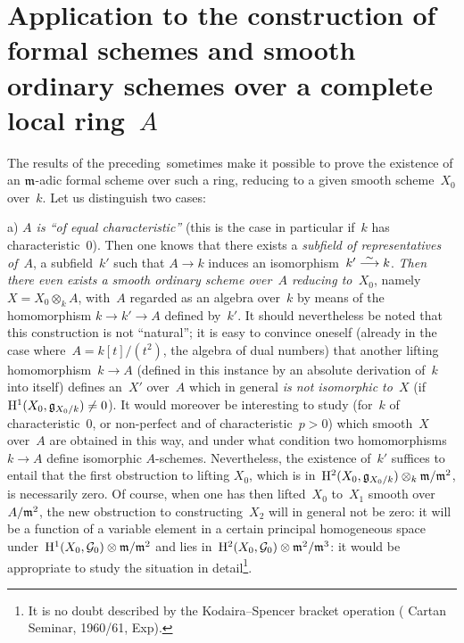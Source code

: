 \section[Application to the construction of formal schemes...]{Application to the construction of formal schemes
and smooth ordinary schemes over a complete local ring~$A$}
\label{III.7}
%
%
The results of the preceding~\No sometimes make it possible to
prove the existence
%
%
of an $\mathfrak{m}$-adic formal scheme over such a ring,
reducing to a given smooth scheme~$X_0$ over~$k$.
Let us distinguish two cases:

a) \emph{$A$ is ``of equal characteristic''} (this is the case
in particular if~$k$ has characteristic~$0$). Then one knows
that there exists a \emph{subfield of representatives of}~$A$,
\ie a subfield~$k'$ such that $A\to k$ induces an isomorphism~$k'\overset{\sim}{\longrightarrow}
k$. \emph{Then there even exists a smooth ordinary scheme
over~$A$ reducing to~$X_0$}, namely~$X=X_0\otimes_kA$, with~$A$
regarded as an algebra over~$k$ by means of the homomorphism
$k\to k'\to A$ defined by~$k'$. It should nevertheless be noted
that this construction is not ``natural''; it is easy to convince
oneself (already in the case where~$A=k[t]/(t^2)$, the algebra of
dual numbers) that another lifting homomorphism~$k\to A$ (defined
in this instance by an absolute derivation of~$k$ into itself)
defines an~$X'$ over~$A$ which in general \emph{is not isomorphic
to~$X$} (if~$\mathrm{H}^1(X_0,\mathfrak{g}_{X_0/k})\neq0$). It would moreover
be interesting to study (for~$k$ of characteristic~$0$, or
non-perfect and of characteristic~$p>0$) which smooth~$X$ over~$A$
are obtained in this way, and under what condition two homomorphisms
$k\to A$ define isomorphic $A$-schemes. Nevertheless, the existence
of~$k'$ suffices to entail that the first obstruction to lifting
$X_0$, which is
in~$\mathrm{H}^2(X_0,\mathfrak{g}_{X_0/k})\otimes_k\mathfrak{m}/\mathfrak{m}^2$, is
necessarily zero. Of course, when one has then lifted~$X_0$ to~$X_1$
smooth over~$A/\mathfrak{m}^2$, the new obstruction to constructing~$X_2$
will in general not be zero: it will be a function of a variable
element in a certain principal homogeneous space
under~$\mathrm{H}^1(X_0,\mathcal{G}_0)\otimes\mathfrak{m}/\mathfrak{m}^2$ and lies
in~$\mathrm{H}^2(X_0,\mathcal{G}_0)\otimes\mathfrak{m}^2/\mathfrak{m}^3$: it would
be appropriate to study the situation in detail\footnote{It is
no doubt described by the Kodaira--Spencer bracket operation (\cf
Cartan Seminar, 1960/61, Exp).}.

